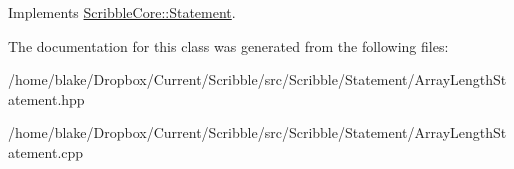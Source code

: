 Implements \hyperlink{class_scribble_core_1_1_statement}{Scribble\-Core\-::\-Statement}.



The documentation for this class was generated from the following files\-:\begin{DoxyCompactItemize}
\item 
/home/blake/\-Dropbox/\-Current/\-Scribble/src/\-Scribble/\-Statement/Array\-Length\-Statement.\-hpp\item 
/home/blake/\-Dropbox/\-Current/\-Scribble/src/\-Scribble/\-Statement/Array\-Length\-Statement.\-cpp\end{DoxyCompactItemize}
